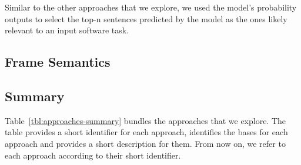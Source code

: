 Similar to the other approaches that we explore, we used the model's probability outputs to select 
the top-n sentences predicted by the model as the ones likely relevant to an input software task.





\subsection{Frame Semantics}








\subsection{Summary}


Table~\ref{tbl:approaches-summary} bundles the approaches that we explore.
The table provides a short identifier for each approach, identifies the bases for each approach and provides a short description for them. From now on, we refer to each approach according to their short identifier.


